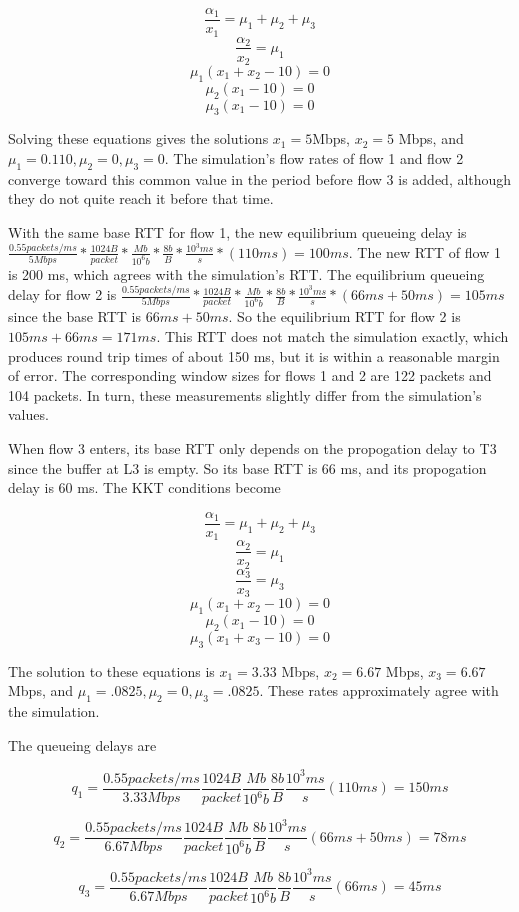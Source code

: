 $$\frac{\alpha_1}{x_1}=\mu_1+\mu_2+\mu_3$$
$$\frac{\alpha_2}{x_2}=\mu_1$$
$$\mu_1 (x_1 + x_2 - 10) = 0$$
$$\mu_2 (x_1 - 10) = 0$$
$$\mu_3 (x_1 - 10) = 0$$

Solving these equations gives the solutions $x_1 = 5$Mbps, $x_2 = 5$ Mbps, and $\mu_1 = 0.110, \mu_2 = 0, \mu_3 = 0$. The simulation's flow rates of flow 1 and flow 2 converge toward this common value in the period before flow 3 is added, although they do not quite reach it before that time.

With the same base RTT for flow 1, the new equilibrium queueing delay is  $\frac{0.55 packets/ms}{5 Mbps} * \frac{1024 B}{packet} * \frac{Mb}{10^6 b} * \frac{8 b}{B} * \frac{10^3 ms}{s} * (110 ms) = 100 ms$. The new RTT of flow 1 is 200 ms, which agrees with the simulation's RTT. The equilibrium queueing delay for flow 2 is $\frac{0.55 packets/ms}{5 Mbps} * \frac{1024 B}{packet} * \frac{Mb}{10^6 b} * \frac{8 b}{B} * \frac{10^3 ms}{s} * (66ms + 50ms) = 105 ms$ since the base RTT is $66 ms + 50 ms$. So the equilibrium RTT for flow 2 is $105ms + 66ms = 171 ms$. This RTT does not match the simulation exactly, which produces round trip times of about 150 ms, but it is within a reasonable margin of error.  The corresponding window sizes for flows 1 and 2 are 122 packets and 104 packets. In turn, these measurements slightly differ from the simulation's values.

When flow 3 enters, its base RTT only depends on the propogation delay to T3 since the buffer at L3 is empty. So its base RTT is 66 ms, and its propogation delay is 60 ms. The KKT conditions become

$$\frac{\alpha_1}{x_1}=\mu_1+\mu_2+\mu_3$$
$$\frac{\alpha_2}{x_2}=\mu_1$$
$$\frac{\alpha_3}{x_3}=\mu_3$$
$$\mu_1 (x_1 + x_2 - 10) = 0$$
$$\mu_2 (x_1 - 10) = 0$$
$$\mu_3 (x_1 + x_3 - 10) = 0$$

The solution to these equations is $x_1 = 3.33$ Mbps, $x_2 = 6.67$ Mbps, $x_3 = 6.67$ Mbps, and $\mu_1 = .0825, \mu_2 = 0, \mu_3 = .0825$. These rates approximately agree with the simulation.

The queueing delays are

$$q_1 = \frac{0.55 packets/ms}{3.33 Mbps} \frac{1024 B}{packet} \frac{Mb}{10^6 b} \frac{8 b}{B} \frac{10^3 ms}{s} (110 ms) = 150 ms$$

$$q_2 = \frac{0.55 packets/ms}{6.67 Mbps} \frac{1024 B}{packet} \frac{Mb}{10^6 b} \frac{8 b}{B} \frac{10^3 ms}{s} (66 ms + 50 ms) = 78 ms$$

$$q_3 = \frac{0.55 packets/ms}{6.67 Mbps} \frac{1024 B}{packet} \frac{Mb}{10^6 b} \frac{8 b}{B} \frac{10^3 ms}{s} (66 ms) = 45 ms$$

